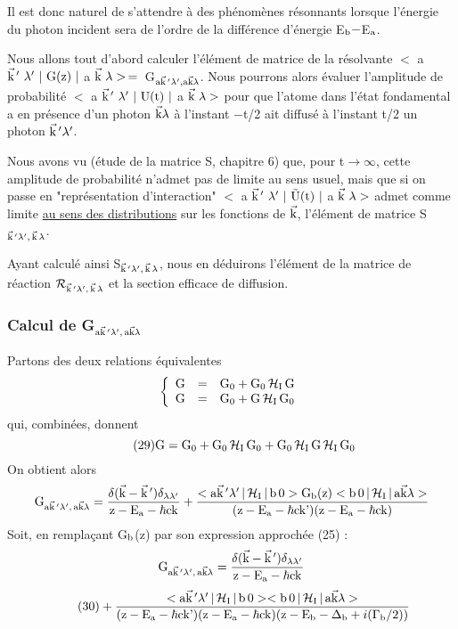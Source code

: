 Il est donc naturel de s'attendre à des phénomènes résonnants
lorsque l'énergie du photon incident sera de l'ordre de la différence d'énergie E$_{\text{b}}-$E$_{\text{a}}$.

Nous allons tout d'abord calculer l'élément de matrice de la
résolvante $<$ a $\vec{\text{k}}\,'\ \lambda'\ |\text{ G(z) }|$ a $\vec{\mt{k}}\ \lambda>\,=\,$
G$_{\text{a}\vec{\text{k}}\,'\lambda',\text{a}\vec{\text{k}}\lambda}$.
Nous pourrons alors évaluer l'amplitude de probabilité
$<$ a $\vec{\text{k}}\,'\ \lambda'\ |\text{ U(t) }|$ a $\vec{\mt{k}}\ \lambda>$ pour que l'atome
dans l'état fondamental a en présence d'un photon $\vec{\text{k}}\lambda$ à l'instant $-$t/2 ait diffusé
à l'instant t/2 un photon $\vec{\text{k}}\,'\lambda'$.

Nous avons vu (étude de la matrice S, chapitre 6)
que, pour t$\to\infty$, cette amplitude de probabilité n'admet pas de limite au
sens usuel, mais que si on passe en "représentation d'interaction"
$<$ a $\vec{\mt{k}}\,'\ \lambda'\ |\ \tilde{\mt{U}}\mt{(t) }|$ a $\vec{\mt{k}}\ \lambda>$
admet comme limite \ul{au sens des distributions} sur
les fonctions de $\vec{\text{k}}$, l'élément de matrice S$_{\vec{\text{k}}\,'\lambda',\,\vec{\text{k}}\,\lambda}$.

Ayant calculé ainsi S$_{\vec{\text{k}}\,'\lambda',\,\vec{\text{k}}\,\lambda}$, nous en déduirons l'élément de
la matrice de réaction $\mathcal{R}_{\vec{\text{k}}\,'\lambda',\,\vec{\text{k}}\,\lambda}$ et la section efficace de diffusion.

\subsubsection{Calcul de G$_{\text{a}\vec{\text{k}}\,'\lambda',\,\text{a}\vec{\text{k}}\lambda}$}%
Partons des deux relations équivalentes
\[
\left\{ \begin{array}{rcl}
\text{G} & = & \text{G}_0+\text{G}_0\,\mathcal{H}_{\text{I}}\,\text{G} \\
\text{G} & = & \text{G}_0+\text{G}\,\mathcal{H}_{\text{I}}\,\text{G}_0 \end{array} \right.
\]
qui, combinées, donnent
\[
\tag{29}\text{G}=\text{G}_0+\text{G}_0\,\mathcal{H}_{\text{I}}\,\text{G}_0+\text{G}_0\,\mathcal{H}_{\text{I}}\,\text{G}\,\mathcal{H}_{\text{I}}\,\text{G}_0
\]
On obtient alors
\[
\text{G}_{\text{a}\vec{\text{k}}\,'\lambda',\,\text{a}\vec{\text{k}}\lambda}=
\frac{\delta(\vec{\text{k}}-\vec{\text{k}}\,')\delta_{\lambda\lambda'}}{\text{z}-\text{E}_{\text{a}}-\hbar\text{ck}}+
\frac{<\text{a}\vec{\text{k}}\,'\lambda'\,|\,\mathcal{H}_{\text{I}}\,|\,\text{b}\,0 >\text{G}_{\text{b}}\text{(z)}
<\text{b}\,0\,|\,\mathcal{H}_{\text{I}}\,|\,\text{a}\vec{\text{k}}\lambda>}
{(\text{z}-\text{E}_{\text{a}}-\hbar\text{ck'})(\text{z}-\text{E}_{\text{a}}-\hbar\text{ck})}
\]
Soit, en remplaçant G$_{\text{b}}$(z) par son expression approchée (25) :
\[
\text{G}_{\text{a}\vec{\text{k}}\,'\lambda',\,\text{a}\vec{\text{k}}\lambda}=
\frac{\delta(\vec{\text{k}}-\vec{\text{k}}\,')\delta_{\lambda\lambda'}}{\text{z}-\text{E}_{\text{a}}-\hbar\text{ck}}
\]
\[
\tag{30}+\frac{<\text{a}\vec{\text{k}}\,'\lambda'\,|\,\mathcal{H}_{\text{I}}\,|\,\text{b}\,0 >
<\text{b}\,0\,|\,\mathcal{H}_{\text{I}}\,|\,\text{a}\vec{\text{k}}\lambda>}
{(\text{z}-\text{E}_{\text{a}}-\hbar\text{ck'})(\text{z}-\text{E}_{\text{a}}-\hbar\text{ck})
(\text{z}-\text{E}_{\text{b}}-\Delta_{\text{b}}+i(\Gamma_{\text{b}}/2))}
\]

